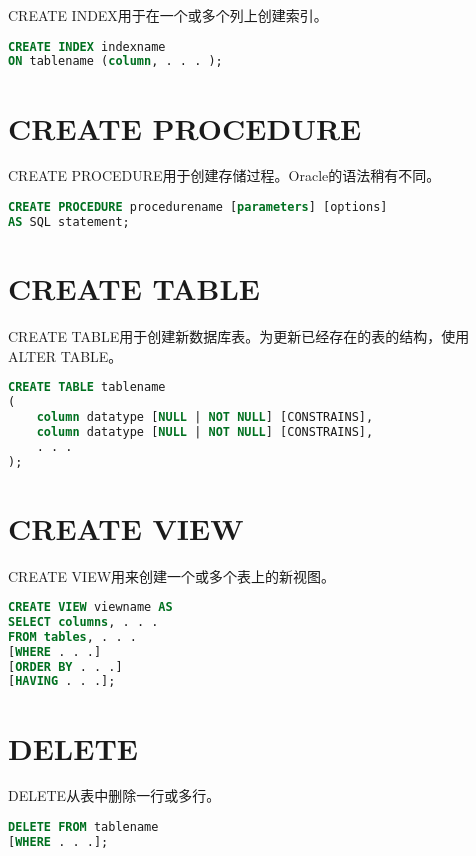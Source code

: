 CREATE INDEX用于在一个或多个列上创建索引。

\begin{lstlisting}[language=SQL]
CREATE INDEX indexname 
ON tablename (column, . . . );
\end{lstlisting}

\section{CREATE PROCEDURE}

CREATE PROCEDURE用于创建存储过程。Oracle的语法稍有不同。

\begin{lstlisting}[language=SQL]
CREATE PROCEDURE procedurename [parameters] [options] 
AS SQL statement;
\end{lstlisting}


\section{CREATE TABLE}

CREATE TABLE用于创建新数据库表。为更新已经存在的表的结构，使用ALTER TABLE。

\begin{lstlisting}[language=SQL]
CREATE TABLE tablename
(
	column datatype [NULL | NOT NULL] [CONSTRAINS],
	column datatype [NULL | NOT NULL] [CONSTRAINS],
	. . .
);
\end{lstlisting}

\section{CREATE VIEW}

CREATE VIEW用来创建一个或多个表上的新视图。

\begin{lstlisting}[language=SQL]
CREATE VIEW viewname AS
SELECT columns, . . .
FROM tables, . . .
[WHERE . . .]
[ORDER BY . . .]
[HAVING . . .];
\end{lstlisting}

\section{DELETE}

DELETE从表中删除一行或多行。

\begin{lstlisting}[language=SQL]
DELETE FROM tablename
[WHERE . . .];
\end{lstlisting}

